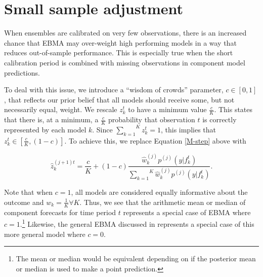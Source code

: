 \documentclass[12pt,fullpage,endnotes]{article}
\begin{document}

\section{Small sample adjustment}
\label{woc}

When ensembles are calibrated on very few observations, there is an
increased chance that EBMA may over-weight high performing models in a
way that reduces out-of-sample performance. This is especially true
when the short calibration period is combined with missing
observations in component model
predictions. %

To deal with this issue, we introduce a ``wisdom of crowds''
parameter, $c \in [0,1]$, that reflects our prior belief that all
models should receive some, but not necessarily equal, weight. We rescale $z^t_k$ to
have a minimum value $\frac{c}{K}$.  This states that there is, at a
minimum, a $\frac{c}{K}$ probability that observation $t$ is correctly
represented by each model $k$.  Since
$\overset{K}{\underset{k=1}{\sum}} z_k^t = 1$, this implies that
$z_k^t \in [\frac{c}{K}, (1-c)]$.  To achieve this, we replace
Equation \ref{M-step} above with

\begin{equation}
\hat{z}^{(j+1)t}_{k} = \frac{c}{K} + (1-c)\frac{\hat{w}^{(j)}_k
p^{(j)}(y|f_{k}^{t})}{\overset{K}{\underset{k=1}{\sum}}\hat{w}^{(j)}_kp^{(j)}(y|f_{k}^{t})}.
\end{equation}

Note that when $c=1$, all models are considered equally informative
about the outcome and $w_k=\frac{1}{K} \forall K$. Thus, we see that
the arithmetic mean or median of component forecasts for time period
$t$ represents a special case of EBMA where $c=1$.\footnote{The mean
  or median would be equivalent depending on if the posterior mean or
  median is used to make a point prediction.}  Likewise, the general
EBMA discussed in \citet{mhw:2012} represents a special case of this
more general model where $c=0$.

\end{document}
